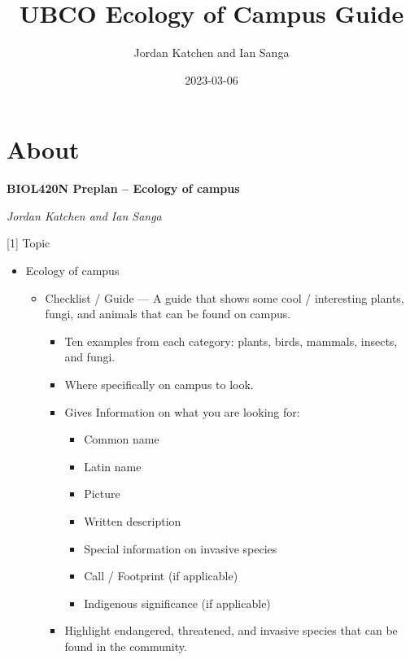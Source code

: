 \documentclass[
]{book}
\title{UBCO Ecology of Campus Guide}
\author{Jordan Katchen and Ian Sanga}
\date{2023-03-06}
\providecommand{\tightlist}{%
  \setlength{\itemsep}{0pt}\setlength{\parskip}{0pt}}
\begin{document}
\maketitle

{
\setcounter{tocdepth}{1}
\tableofcontents
}
\hypertarget{about}{%
\chapter{About}\label{about}}

\textbf{BIOL420N Preplan -- Ecology of campus}

\emph{Jordan Katchen and Ian Sanga}

{{[}1{]} Topic}

\begin{itemize}
\tightlist
\item
  Ecology of campus

  \begin{itemize}
  \tightlist
  \item
    Checklist / Guide --- A guide that shows some cool / interesting plants, fungi, and animals that can be found on campus.

    \begin{itemize}
    \tightlist
    \item
      Ten examples from each category: plants, birds, mammals, insects, and fungi.
    \item
      Where specifically on campus to look.
    \item
      Gives Information on what you are looking for:

      \begin{itemize}
      \tightlist
      \item
        Common name
      \item
        Latin name
      \item
        Picture
      \item
        Written description
      \item
        Special information on invasive species
      \item
        Call / Footprint (if applicable)
      \item
        Indigenous significance (if applicable)
      \end{itemize}
    \item
      Highlight endangered, threatened, and invasive species that can be found in the community.
    \end{itemize}
  \end{itemize}
\end{itemize}
\end{document}
